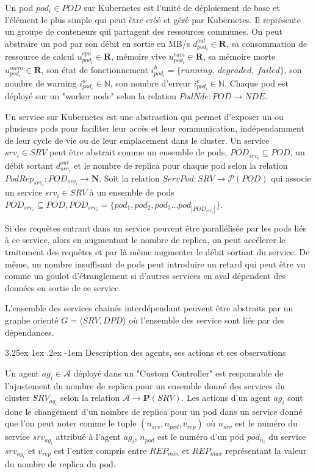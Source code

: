 \documentclass[conference]{IEEEtran}
\makeatletter
\renewcommand\paragraph{\@startsection{paragraph}{5}{\z@}%
  {3.25ex \@plus1ex \@minus.2ex}%
  {-1em}%
  {\normalfont\normalsize\bfseries}}
\makeatother
\begin{document}
Un pod $pod_{i} \in POD$ sur Kubernetes est l'unité de déploiement de base et l'élément le plus simple qui peut être créé et géré par Kubernetes. Il représente un groupe de conteneurs qui partagent des ressources communes. On peut abstraire un pod par son débit en sortie en MB/s $d^{out}_{pod_i} \in \mathbf{R}$, sa consommation de ressource de calcul $u^{cpu}_{pod_i} \in \mathbf{R}$, mémoire vive $u^{ram}_{pod_i} \in \mathbf{R}$, sa mémoire morte $u^{mem}_{pod_i} \in \mathbf{R}$, son état de fonctionnement $i^{h}_{pod_i} = \{running, \ degraded, \ failed\}$, son nombre de warning $i^{w}_{pod_i} \in \mathbb{N}$, son nombre d'erreur $i^{e}_{pod_i} \in \mathbb{N}$. Chaque pod est déployé sur un "worker node" selon la relation $PodNde: POD \rightarrow NDE$.

Un service sur Kubernetes est une abstraction qui permet d’exposer un ou plusieurs pods pour faciliter leur accès et leur communication, indépendamment de leur cycle de vie ou de leur emplacement dans le cluster. Un service $srv_i \in SRV$ peut être abstrait comme un ensemble de pods, $POD_{srv_i} \subseteq POD$, un débit sortant $d^{out}_{srv_i}$ et le nombre de replica pour chaque pod selon la relation $PodRep_{srv_i}: POD_{srv_i} \rightarrow \mathbf{N}$.
Soit la relation $ServPod: SRV \rightarrow \mathcal{P}(POD)$ qui associe un service $srv_i \in SRV$ à un ensemble de pods $POD_{srv_i} \subseteq POD, POD_{srv_i} = \{pod_1, pod_2, pod_3 \dots pod_{|POD_{srv_i}|}\}$.

Si des requêtes entrant dans un service peuvent être parallélisée par les pods liés à ce service, alors en augmentant le nombre de replica, on peut accélerer le traitement des requêtes et par là même augmenter le débit sortant du service. De même, un nombre insuffisant de pods peut introduire un retard qui peut être vu comme un goulot d'étranglement si d'autres services en aval dépendent des données en sortie de ce service.

L'ensemble des services chainés interdépendant peuvent être abstraits par un graphe orienté $G = \langle SRV, DPD \rangle$ où l'ensemble des service sont liés par des dépendances.

\paragraph{Description des agents, ses actions et ses observations}

Un agent $ag_i \in \mathcal{A}$ déployé dans un "Custom Controller" est responsable de l'ajustement du nombre de replica pour un ensemble donné des services du cluster $SRV_{ag_i}$ selon la relation $\mathcal{A} \rightarrow \mathbf{P}(SRV)$.
Les actions d'un agent $ag_i$ sont donc le changement d'un nombre de replica pour un pod dans un service donné que l'on peut noter comme le tuple $(n_{srv}, n_{pod}, v_{rep})$ où $n_{srv}$ est le numéro du service $srv_{ag_i}$ attribué à l'agent $ag_i$, $n_{pod}$ est le numéro d'un pod $pod_{n_i}$ du service $srv_{ag_i}$ et $v_{rep}$ est l'entier compris entre $REP_{min}$ et $REP_{max}$ représentant la valeur du nombre de replica du pod.
\end{document}
